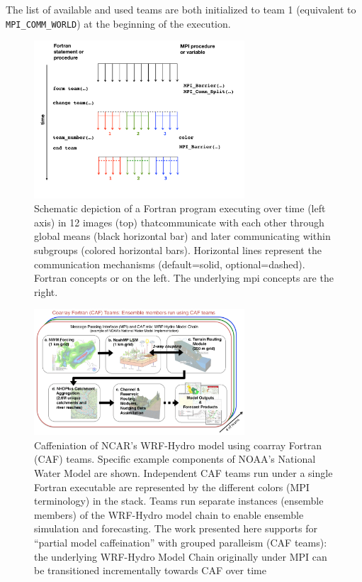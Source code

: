 The list of available and used teams are both initialized to team 1 (equivalent to \texttt{MPI\_COMM\_WORLD}) at the beginning of the execution.

\begin{figure}
\includegraphics[width=0.7\textwidth]{figures/teams}
\vspace{-36pt}
\caption{Schematic depiction of a Fortran program executing over time (left axis) in 12 images (top) thatcommunicate with each other through global means (black horizontal bar) and later communicating within subgroups (colored horizontal bars).  Horizontal lines represent the communication mechanisms (default=solid, optional=dashed).  Fortran concepts or on the left.  The underlying \gls{mpi} concepts are the right.}
\end{figure}
%

\begin{figure}
\includegraphics[width=0.7\textwidth]{figures/WRF-Hydro-caf-ens-model_chain.png}
\vspace{-7pt}
\caption{Caffeniation of NCAR's WRF-Hydro model using coarray Fortran (CAF)
  teams. Specific example components of  NOAA's National Water
  Model are shown. Independent CAF teams run under a single Fortran executable are represented by the different colors
  (MPI terminology) in the stack.  Teams run separate instances
  (ensemble members) of the WRF-Hydro model chain to enable ensemble
  simulation and forecasting. The work presented  here supports for ``partial model caffeination'' with grouped
  paralleism (CAF teams): the underlying WRF-Hydro Model Chain
  originally under MPI can be transitioned incrementally towards CAF
  over time}
\end{figure}
%

